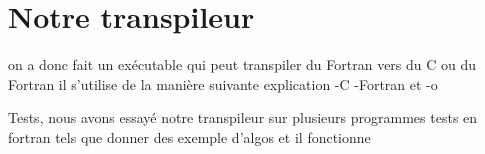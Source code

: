 \section{Notre transpileur}

\begin{frame}
    on a donc fait un exécutable qui peut transpiler du Fortran vers du C ou du Fortran
    il s'utilise de la manière suivante
    explication -C -Fortran et -o 

\end{frame}


\begin{frame}
    Tests, nous avons essayé notre transpileur sur plusieurs programmes tests en fortran tels que 
    donner des exemple d'algos
    et il fonctionne
\end{frame}

